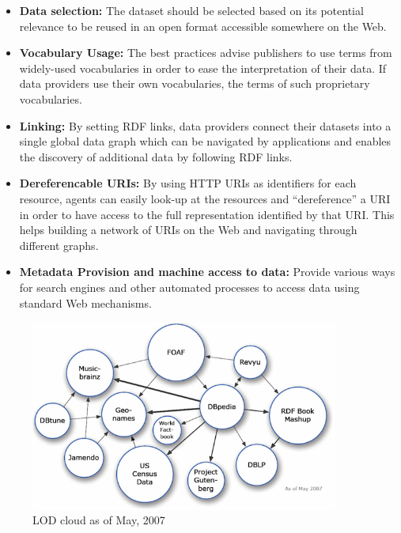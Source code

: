 \begin{itemize}
\item \textbf{Data selection:} The dataset should be selected based on its potential relevance to be reused in an open format accessible somewhere on the Web.
\item \textbf{Vocabulary Usage:} The best practices advise publishers to use terms from widely-used vocabularies in order to ease the interpretation of their data. If data providers use their own vocabularies, the terms of such proprietary vocabularies.

\item \textbf{Linking:} By setting RDF links, data providers connect their datasets into a single global data graph which can be navigated by applications and enables the discovery of additional data by following RDF links.

\item \textbf{Dereferencable URIs:} By using HTTP URIs as identifiers for each resource, agents can easily look-up at the resources and ``dereference'' a URI in order to have access to the full representation identified by that URI. This helps building a network of URIs on the Web and navigating through different graphs. 

\item \textbf{Metadata Provision and machine access to data:} Provide various ways for search engines and other automated processes to access data using standard Web mechanisms.
\end{itemize}

\begin{figure}[ht!]
\includegraphics[width=0.9\textwidth]{img/lod-cloud2007.png}
\caption{LOD cloud as of May, 2007}
\label{fig:lodcloud2007}
\end{figure}

